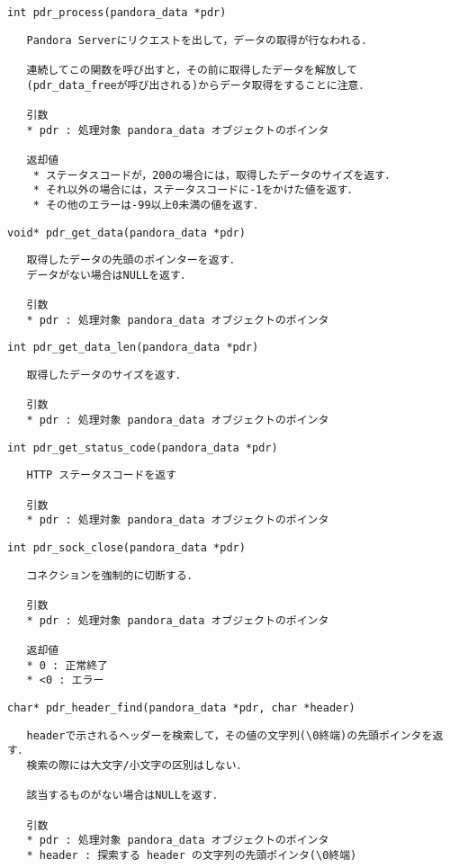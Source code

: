 {\large\verb|int pdr_process(pandora_data *pdr)|}
\begin{verbatim}
   Pandora Serverにリクエストを出して，データの取得が行なわれる．

   連続してこの関数を呼び出すと，その前に取得したデータを解放して
   (pdr_data_freeが呼び出される)からデータ取得をすることに注意．

   引数
   * pdr : 処理対象 pandora_data オブジェクトのポインタ

   返却値
    * ステータスコードが，200の場合には，取得したデータのサイズを返す．
    * それ以外の場合には，ステータスコードに-1をかけた値を返す．
    * その他のエラーは-99以上0未満の値を返す．
\end{verbatim}
{\large\verb|void* pdr_get_data(pandora_data *pdr)|}
\begin{verbatim}
   取得したデータの先頭のポインターを返す．
   データがない場合はNULLを返す．

   引数
   * pdr : 処理対象 pandora_data オブジェクトのポインタ
\end{verbatim}
{\large\verb|int pdr_get_data_len(pandora_data *pdr)|}
\begin{verbatim}
   取得したデータのサイズを返す．

   引数
   * pdr : 処理対象 pandora_data オブジェクトのポインタ
\end{verbatim}
{\large\verb|int pdr_get_status_code(pandora_data *pdr)|}
\begin{verbatim}
   HTTP ステータスコードを返す

   引数
   * pdr : 処理対象 pandora_data オブジェクトのポインタ
\end{verbatim}
{\large\verb|int pdr_sock_close(pandora_data *pdr)|}
\begin{verbatim}
   コネクションを強制的に切断する．

   引数
   * pdr : 処理対象 pandora_data オブジェクトのポインタ

   返却値
   * 0 : 正常終了
   * <0 : エラー
\end{verbatim}
{\large\verb|char* pdr_header_find(pandora_data *pdr, char *header)|}
\begin{verbatim}
   headerで示されるヘッダーを検索して，その値の文字列(\0終端)の先頭ポインタを返す．
   検索の際には大文字/小文字の区別はしない．

   該当するものがない場合はNULLを返す．

   引数
   * pdr : 処理対象 pandora_data オブジェクトのポインタ
   * header : 探索する header の文字列の先頭ポインタ(\0終端)
\end{verbatim}
